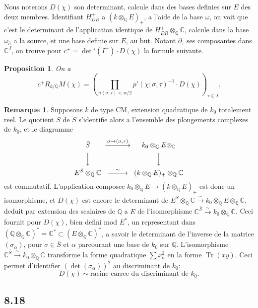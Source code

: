 \documentclass[12pt,a4paper]{article}
\theoremstyle{plain}
\newtheorem{proposition}[theorem]{Proposition}
\theoremstyle{definition}
\newtheorem{remark}[definition]{Remarque}
\theoremstyle{remark}
\DeclareMathOperator{\Tr}{Tr}
\newcommand{\Q}{\mathbb{Q}}
\newcommand{\C}{\mathbb{C}}
\begin{document}
Nous noterons $D(\chi)$ son determinant, calcule dans des bases definies sur $E$ des
deux membres. Identifiant $H_{DR}^+$ a $(k \otimes_\Q E)_+$, a l'aide de la base $\omega$,
on voit que c'est le determinant de l'application identique de $H_{DR}^+ \otimes_\Q \C$, calcule
dans la base $\omega_{\bar{\sigma}}$ a la source, et une base definie sur $E$, au but. Notant
$\partial_\tau$ ses composantes dans $\C^J$, on trouve pour $c^+ = \det'(I^+) \cdot D(\chi)$ la
formule suivante.

\begin{proposition}\label{prop:8.16}
On a
\[
c^+ R_{k/\Q} M(\chi) = \left(\prod_{n(\sigma,\tau) < w/2} p'(\chi; \sigma, \tau)^{-1} \cdot D(\chi)\right)_{\tau \in J}.
\]
\end{proposition}

\begin{remark}
Supposons $k$ de type CM, extension quadratique de $k_0$ totalement reel. Le quotient
$\bar{S}$ de $S$ s'identifie alors a l'ensemble des plongements complexes de $k_0$, et le
diagramme
\[
\begin{CD}
\bar{S} @>{\sigma \mapsto (\sigma,\tau)}>> k_0 \otimes_\Q E \otimes_\C \\
@VVV @VVV \\
E^{\bar{S}} \otimes_\Q \C @>{\sim}>> (k \otimes_\Q E)_+ \otimes_\Q \C
\end{CD}
\]
est commutatif. L'application composee $k_0 \otimes_\Q E \to (k \otimes_\Q E)_+$ est donc
un isomorphisme, et $D(\chi)$ est encore le determinant de $E^{\bar{S}} \otimes_\Q \C \xrightarrow{\sim}
k_0 \otimes_\Q E \otimes_\Q \C$, deduit par extension des scalaires de $\Q$ a $E$ de
l'isomorphisme $\C^{\bar{S}} \xrightarrow{\sim} k_0 \otimes_\Q \C$. Ceci fournit pour $D(\chi)$, bien
defini mod $E^*$, un representant dans $(\Q \otimes_\Q \C)^* = \C^* \subset (E \otimes_\Q \C)^*$,
a savoir le determinant de l'inverse de la matrice $(\sigma_\alpha)$, pour $\sigma \in \bar{S}$ et
$\alpha$ parcourant une base de $k_0$ sur $\Q$. L'isomorphisme $\C^{\bar{S}} \xrightarrow{\sim} k_0 \otimes_\Q \C$
transforme la forme quadratique $\sum x_\sigma^2$ en la forme $\Tr(xy)$. Ceci permet
d'identifier $(\det(\sigma_\alpha))^2$ au discriminant de $k_0$:
\[
D(\chi) \sim \text{racine carree du discriminant de } k_0.
\]
\end{remark}

\subsection*{8.18}
\end{document}
